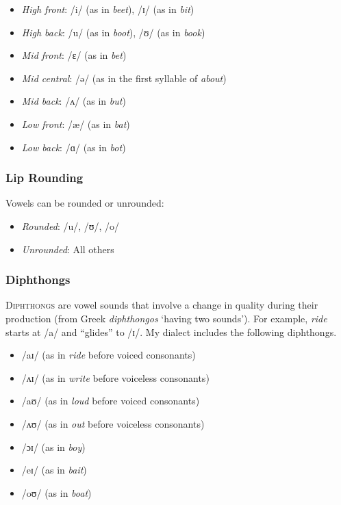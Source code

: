 \begin{itemize}[noitemsep]
    \item \textit{High front}: /i/ (as in \textit{beet}), /ɪ/ (as in \textit{bit})
    \item \textit{High back}: /u/ (as in \textit{boot}), /ʊ/ (as in \textit{book})
    \item \textit{Mid front}: /ɛ/ (as in \textit{bet})
    \item \textit{Mid central}: /ə/ (as in the first syllable of \textit{about})
    \item \textit{Mid back}: /ʌ/ (as in \textit{but})
    \item \textit{Low front}: /æ/ (as in \textit{bat})
    \item \textit{Low back}: /ɑ/ (as in \textit{bot})
\end{itemize}

\subsubsection{Lip Rounding}

Vowels can be rounded or unrounded:

\begin{itemize}[noitemsep]
    \item \textit{Rounded}: /u/, /ʊ/, /o/
    \item \textit{Unrounded}: All others
\end{itemize}

\subsubsection{Diphthongs}

\textsc{Diphthongs} are vowel sounds that involve a change in quality during their production (from Greek \textit{diphthongos} `having two sounds'). For example, \textit{ride} starts at /a/ and ``glides'' to /ɪ/. My dialect includes the following diphthongs.

\begin{itemize}[noitemsep]
    \item /aɪ/ (as in \textit{ride} before voiced consonants)
    \item /ʌɪ/ (as in \textit{write} before voiceless consonants)
    \item /aʊ/ (as in \textit{loud} before voiced consonants)
    \item /ʌʊ/ (as in \textit{out} before voiceless consonants)
    \item /ɔɪ/ (as in \textit{boy})
    \item /eɪ/ (as in \textit{bait})
    \item /oʊ/ (as in \textit{boat})
\end{itemize}

